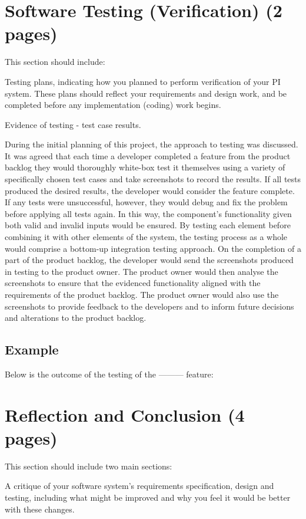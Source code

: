 \documentclass[12pt]{article}
\begin{document}
\section{Software Testing (Verification) (2 pages)}

This section should include:

Testing plans, indicating how you planned to perform verification of your PI system.
These plans should reflect your requirements and design work, and be completed
before any implementation (coding) work begins.

Evidence of testing - test case results.

During the initial planning of this project, the approach to testing was discussed. It was agreed that each time a developer completed a feature from the product backlog they would thoroughly white-box test it themselves using a variety of specifically chosen test cases and take screenshots to record the results. If all tests produced the desired results, the developer would consider the feature complete. If any tests were unsuccessful, however, they would debug and fix the problem before applying all tests again. In this way, the component's functionality given both valid and invalid inputs would be ensured. By testing each element before combining it with other elements of the system, the testing process as a whole would comprise a bottom-up integration testing approach. On the completion of a part of the product backlog, the developer would send the screenshots produced in testing to the product owner. The product owner would then analyse the screenshots to ensure that the evidenced functionality aligned with the requirements of the product backlog. The product owner would also use the screenshots to provide feedback to the developers and to inform future decisions and alterations to the product backlog.\par
\subsection{Example}
Below is the outcome of the testing of the --------- feature:

\section{Reflection and Conclusion (4 pages)}

This section should include two main sections:

A critique of your software system’s requirements specification, design and testing,
including what might be improved and why you feel it would be better with these
changes.
\end{document}
